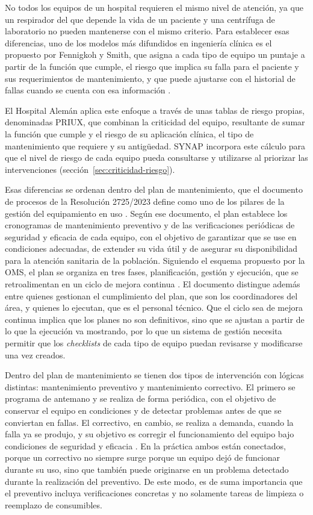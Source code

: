 \documentclass[10pt]{article}
\begin{document}
No todos los equipos de un hospital requieren el mismo nivel de atención, ya que un respirador del que depende la vida de un paciente y una centrífuga de laboratorio no pueden mantenerse con el mismo criterio. Para establecer esas diferencias, uno de los modelos más difundidos en ingeniería clínica es el propuesto por Fennigkoh y Smith, que asigna a cada tipo de equipo un puntaje a partir de la función que cumple, el riesgo que implica su falla para el paciente y sus requerimientos de mantenimiento, y que puede ajustarse con el historial de fallas cuando se cuenta con esa información \cite{fennigkoh_smith}. 

El Hospital Alemán aplica este enfoque a través de unas tablas de riesgo propias, denominadas PRIUX, que combinan la criticidad del equipo, resultante de sumar la función que cumple y el riesgo de su aplicación clínica, el tipo de mantenimiento que requiere y su antigüedad. SYNAP incorpora este cálculo para que el nivel de riesgo de cada equipo pueda consultarse y utilizarse al priorizar las intervenciones (sección~\ref{sec:criticidad-riesgo}).

Esas diferencias se ordenan dentro del plan de mantenimiento, que el documento de procesos de la Resolución 2725/2023 define como uno de los pilares de la gestión del equipamiento en uso \cite{res_2725_2023}. Según ese documento, el plan establece los cronogramas de mantenimiento preventivo y de las verificaciones periódicas de seguridad y eficacia de cada equipo, con el objetivo de garantizar que se use en condiciones adecuadas, de extender su vida útil y de asegurar su disponibilidad para la atención sanitaria de la población. Siguiendo el esquema propuesto por la OMS, el plan se organiza en tres fases, planificación, gestión y ejecución, que se retroalimentan en un ciclo de mejora continua \cite{oms_manten_2012}. El documento distingue además entre quienes gestionan el cumplimiento del plan, que son los coordinadores del área, y quienes lo ejecutan, que es el personal técnico. Que el ciclo sea de mejora continua implica que los planes no son definitivos, sino que se ajustan a partir de lo que la ejecución va mostrando, por lo que un sistema de gestión necesita permitir que los \textit{checklists} de cada tipo de equipo puedan revisarse y modificarse una vez creados.

Dentro del plan de mantenimiento se tienen dos tipos de intervención con lógicas distintas: mantenimiento preventivo y mantenimiento correctivo. El primero se programa de antemano y se realiza de forma periódica, con el objetivo de conservar el equipo en condiciones y de detectar problemas antes de que se conviertan en fallas. El correctivo, en cambio, se realiza a demanda, cuando la falla ya se produjo, y su objetivo es corregir el funcionamiento del equipo bajo condiciones de seguridad y eficacia \cite{res_2725_2023}. En la práctica ambos están conectados, porque un correctivo no siempre surge porque un equipo dejó de funcionar durante su uso, sino que también puede originarse en un problema detectado durante la realización del preventivo. De este modo, es de suma importancia que el preventivo incluya verificaciones concretas y no solamente tareas de limpieza o reemplazo de consumibles.
\end{document}
